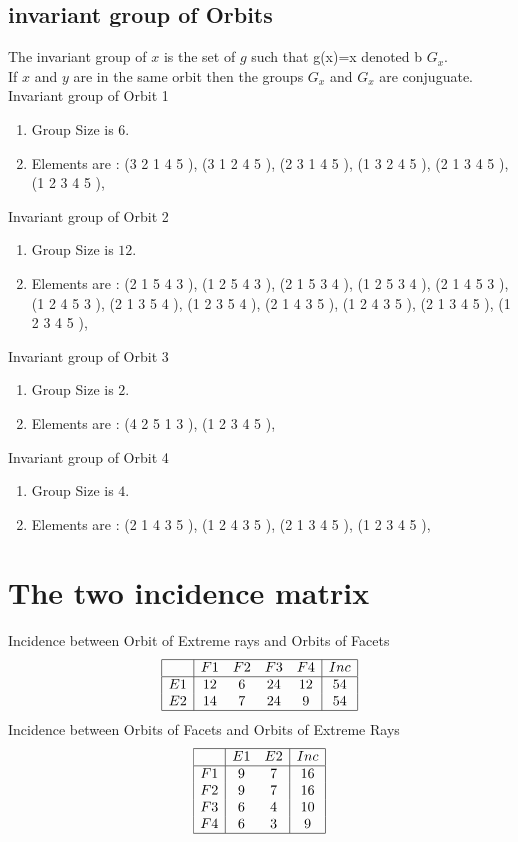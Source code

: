 \documentclass[12pt]{article}
\begin{document}
\subsection{invariant group of Orbits}
\noindent The invariant group of $x$ is the set of $g$ such that g(x)=x denoted b $G_x$.\\
If $x$ and $y$ are in the same orbit then the groups $G_x$ and  $G_x$ are conjuguate.\\
Invariant group of Orbit 1
\begin{enumerate}
\item Group Size is $6$.
\item Elements are : (3 2 1 4 5  ), (3 1 2 4 5  ), (2 3 1 4 5  ), (1 3 2 4 5  ), (2 1 3 4 5  ), (1 2 3 4 5  ), 
\end{enumerate}
Invariant group of Orbit 2
\begin{enumerate}
\item Group Size is $12$.
\item Elements are : (2 1 5 4 3  ), (1 2 5 4 3  ), (2 1 5 3 4  ), (1 2 5 3 4  ), (2 1 4 5 3  ), (1 2 4 5 3  ), (2 1 3 5 4  ), (1 2 3 5 4  ), (2 1 4 3 5  ), (1 2 4 3 5  ), (2 1 3 4 5  ), (1 2 3 4 5  ), 
\end{enumerate}
Invariant group of Orbit 3
\begin{enumerate}
\item Group Size is $2$.
\item Elements are : (4 2 5 1 3  ), (1 2 3 4 5  ), 
\end{enumerate}
Invariant group of Orbit 4
\begin{enumerate}
\item Group Size is $4$.
\item Elements are : (2 1 4 3 5  ), (1 2 4 3 5  ), (2 1 3 4 5  ), (1 2 3 4 5  ), 
\end{enumerate}
\section{The two incidence matrix}
Incidence between Orbit of Extreme rays and Orbits of Facets
\begin{equation*}
\begin{array}{|c|cccc|c|}
\hline
&F1&F2&F3&F4&Inc\\
\hline
E1&12&6&24&12&54\\
E2&14&7&24&9&54\\
\hline
\end{array}
\end{equation*}
Incidence between Orbits of Facets and Orbits of Extreme Rays
\begin{equation*}
\begin{array}{|c|cc|c|}
\hline
&E1&E2&Inc\\
\hline
F1&9&7&16\\
F2&9&7&16\\
F3&6&4&10\\
F4&6&3&9\\
\hline
\end{array}
\end{equation*}
\end{document}
